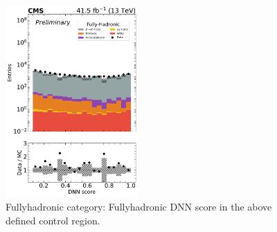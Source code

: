 
\begin{figure}[h!]
    \centering
    \includegraphics[width=0.45\textwidth]{Sections/HHWWgg/images/DNN_andSignal_Validation/fullyhadronic/evalDNN_WWvsAll_HHWWggTag_1_log.pdf}
    \caption{Fullyhadronic category: Fullyhadronic DNN score in the above defined control region. \label{fig:FH_DNN_Score} }
\end{figure}

